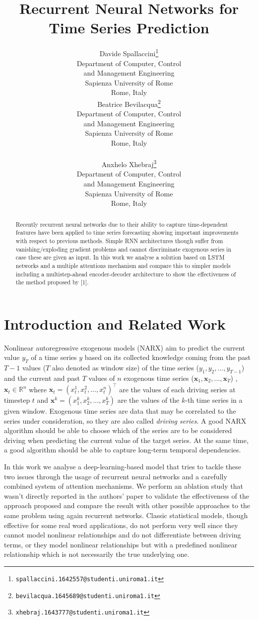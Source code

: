 \documentclass{article}
\title{Recurrent Neural Networks for Time Series Prediction}
\author{
  Davide Spallaccini\thanks{\texttt{spallaccini.1642557@studenti.uniroma1.it}}
\\
  Department of Computer, Control \\ and Management Engineering\\
  Sapienza University of Rome\\
  Rome, Italy \\
  \And
  Beatrice Bevilacqua\thanks{\texttt{bevilacqua.1645689@studenti.uniroma1.it}}
\\
  Department of Computer, Control \\ and Management Engineering\\
  Sapienza University of Rome\\
  Rome, Italy \\
   \\
  \And
  Anxhelo Xhebraj\thanks{\texttt{xhebraj.1643777@studenti.uniroma1.it}} \\
  Department of Computer, Control \\ and Management Engineering\\
  Sapienza University of Rome\\
  Rome, Italy
}
\begin{document}

\maketitle

\begin{abstract}

Recently recurrent neural networks due to their ability to capture
time-dependent
features have been applied to time series forecasting showing important
improvements with respect to previous methods. Simple RNN architectures though
suffer from vanishing/exploding gradient problems and cannot discriminate
exogenous series in case these are given as input. In this work we analyse a
solution based on LSTM networks and a multiple attentions mechanism and compare
this to simpler models including a multistep-ahead encoder-decoder architecture
to show the effectiveness of the method proposed by [1].

\end{abstract}

\section{Introduction and Related Work}
\label{sec:intro}

Nonlinear autoregressive exogenous models (NARX) aim to predict the current
value $y_T$ of a time series $y$ based on its
collected knowledge coming from the past $T -1$ values ($T$ also denoted as
window size) of
the time series ($y_{1}, y_{2}, ..., y_{T-1}$) and the current and past $T$
values of $n$
exogenous time series ($\mathbf{x}_{1}, \mathbf{x}_{2}, ..., \mathbf{x}_{T}$)
, $\mathbf{x}_t \in \mathbb{R}^n$ where $\mathbf{x}_t = (x_t^1, x_t^2, ...,
x_t^n)^\top$
are the values of each driving series at timestep $t$ and $\mathbf{x}^k =
(x_1^k, x_2^k, ..., x_T^k)$ are the values of the $k$-th time series in a given
window. Exogenous time series
are data that may be correlated to the series under consideration, so they are
also called \textit{driving series}. A good NARX algorithm should be able to
choose which of the series are to be
considered driving when predicting the current value of the target series.
At the same time, a good algorithm should be able to capture long-term temporal
dependencies.

In this work we analyse a deep-learning-based model that tries to tackle
these two issues through the usage of
recurrent neural networks and a carefully combined system of attention
mechanisms. We perform an ablation study that wasn't directly reported in the
authors' paper to validate the effectiveness of the approach proposed and
compare the result with other possible approaches to the same problem using
again recurrent networks.
Classic statistical models, though effective for some real word applications,
do not perform very well since they cannot
model nonlinear relationships and do not differentiate between driving terms, or
they model nonlinear relationships
but with a predefined nonlinear relationship which is not necessarily the true
underlying one.
\end{document}
